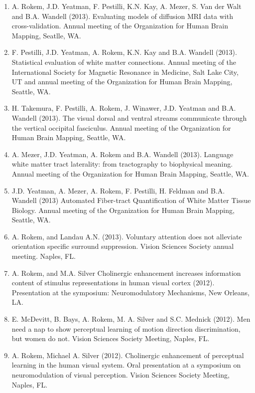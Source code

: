 \documentclass[11pt,fullpage]{article}
\begin{document}
\begin{enumerate}
\item A. Rokem, J.D. Yeatman, F. Pestilli, K.N. Kay, A. Mezer, S. Van der Walt and B.A. Wandell (2013). Evaluating models of diffusion MRI data with cross-validation. Annual meeting of the Organization for Human Brain Mapping, Seatlle, WA.

\item F. Pestilli, J.D. Yeatman, A. Rokem, K.N. Kay and B.A. Wandell (2013). Statistical evaluation of white matter connections. Annual meeting of the International Society for Magnetic Resonance in Medicine, Salt Lake City, UT and annual meeting of the Organization for Human Brain Mapping, Seattle, WA.

\item H. Takemura, F. Pestilli, A. Rokem, J. Winawer, J.D. Yeatman and B.A. Wandell (2013). The visual dorsal and ventral streams communicate through the vertical occipital fasciculus. Annual meeting of the Organization for Human Brain Mapping, Seattle, WA.

\item A. Mezer, J.D. Yeatman, A. Rokem and B.A. Wandell (2013). Language white matter tract laterality: from tractography to biophysical meaning. Annual meeting of the Organization for Human Brain Mapping, Seattle, WA.

\item J.D. Yeatman, A. Mezer, A. Rokem, F. Pestilli, H. Feldman and B.A. Wandell (2013) Automated Fiber-tract Quantification of White Matter Tissue Biology. Annual meeting of the Organization for Human Brain Mapping, Seattle, WA.

\item A. Rokem, and Landau A.N. (2013). Voluntary attention does not alleviate orientation specific surround suppression. Vision Sciences Society annual meeting. Naples, FL.

\item A. Rokem, and M.A. Silver Cholinergic enhancement increases information content of stimulus representations in human visual cortex (2012). Presentation at the symposium: Neuromodulatory Mechanisms, New Orleans, LA.

\item E. McDevitt, B. Bays, A. Rokem, M. A. Silver and S.C. Mednick (2012). Men need a nap to show perceptual learning of motion direction discrimination, but women do not. Vision Sciences Society Meeting, Naples, FL.

\item A. Rokem, Michael A. Silver (2012). Cholinergic enhancement of perceptual learning in the human visual system. Oral presentation at a symposium on neuromodulation of visual perception. Vision Sciences Society Meeting, Naples, FL.


\end{enumerate}
\end{document}
